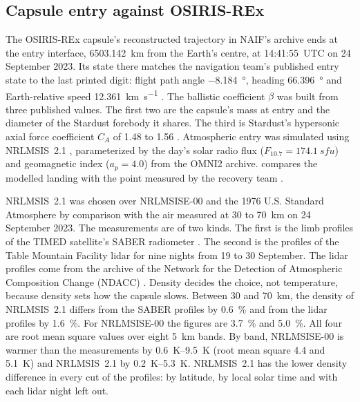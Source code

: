 \documentclass[11pt,a4paper]{article}
\begin{document}
\subsection{Capsule entry against OSIRIS-REx}

The OSIRIS-REx capsule's reconstructed trajectory in NAIF's archive ends at the entry
interface, \qty{6503.142}{\km} from the Earth's centre, at 14:41:55~UTC on 24 September
2023. Its state there matches the navigation team's published entry state to the last
printed digit: flight path angle \qty{-8.184}{\degree}, heading \qty{66.396}{\degree} and
Earth-relative speed \qty{12.361}{\km\per\s} \citep{wibben2024}. The ballistic coefficient
$\beta$ was built from three published values. The first two are the capsule's mass at entry
and the diameter of the Stardust forebody it shares. The third is Stardust's hypersonic axial
force coefficient $C_A$ of 1.48 to 1.56 \citep{mitcheltree1997}. Atmospheric entry was simulated
using NRLMSIS~2.1 \citep{emmert2022}, parameterized by the day's solar radio flux
($F_{10.7} = \qty{174.1}{sfu}$) and geomagnetic index ($a_p = 4.0$) from the OMNI2
archive.  compares the modelled landing with the point measured by the
recovery team \citep{francis2024}.

NRLMSIS~2.1 was chosen over NRLMSISE-00 \citep{picone2002} and the 1976 U.S. Standard
Atmosphere by comparison with the air measured at 30 to \qty{70}{\km} on 24 September 2023. The
measurements are of two kinds. The first is the limb profiles of the TIMED satellite's SABER
radiometer \citep{russell1999}. The second is the profiles of the Table Mountain Facility lidar
for nine nights from 19 to 30 September. The lidar profiles come from the archive of the Network
for the Detection of Atmospheric Composition Change (NDACC) \citep{demaziere2018}. Density
decides the choice, not temperature, because density sets how the capsule slows. Between 30 and
\qty{70}{\km}, the density of NRLMSIS~2.1 differs from the SABER profiles by \qty{0.6}{\percent}
and from the lidar profiles by \qty{1.6}{\percent}. For NRLMSISE-00 the figures are
\qty{3.7}{\percent} and \qty{5.0}{\percent}. All four are root mean square values over eight
\qty{5}{\km} bands. By band, NRLMSISE-00 is warmer than the measurements by \qtyrange{0.6}{9.5}{\kelvin}
(root mean square 4.4 and \qty{5.1}{\kelvin}) and NRLMSIS~2.1 by \qtyrange{0.2}{5.3}{\kelvin}.
NRLMSIS~2.1 has the lower density difference in every cut of the profiles: by latitude, by
local solar time and with each lidar night left out.
\end{document}
